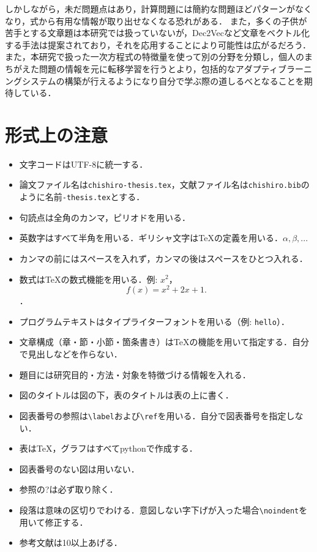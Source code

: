 \documentclass[a4j,11pt,report]{jsbook}
\begin{document}
しかしながら，未だ問題点はあり，計算問題には簡約な問題ほどパターンがなくなり，式から有用な情報が取り出せなくなる恐れがある．
また，多くの子供が苦手とする文章題は本研究では扱っていないが，Dec2Vecなど文章をベクトル化する手法は提案されており，それを応用することにより可能性は広がるだろう．
また，本研究で扱った一次方程式の特徴量を使って別の分野を分類し，個人のまちがえた問題の情報を元に転移学習を行うとより，包括的なアダプティブラーニングシステムの構築が行えるようになり自分で学ぶ際の道しるべとなることを期待している．



\chapter{形式上の注意}

\begin{itemize}
  \item 文字コードはUTF-8に統一する．
  \item 論文ファイル名は\texttt{chishiro-thesis.tex}，文献ファイル名は\texttt{chishiro.bib}のように名前\texttt{-thesis.tex}とする．
  \item 句読点は全角のカンマ，ピリオドを用いる．
  \item 英数字はすべて半角を用いる．ギリシャ文字は{\TeX}の定義を用いる．$\alpha, \beta, ...$
  \item カンマの前にはスペースを入れず，カンマの後はスペースをひとつ入れる．
  \item 数式は{\TeX}の数式機能を用いる．例: $x^2$，\[f(x) = x^2 + 2x + 1.\]．
  \item プログラムテキストはタイプライターフォントを用いる（例: \texttt{hello}）．
  \item 文章構成（章・節・小節・箇条書き）は{\TeX}の機能を用いて指定する．自分で見出しなどを作らない．
  \item 題目には研究目的・方法・対象を特徴づける情報を入れる．
  \item 図のタイトルは図の下，表のタイトルは表の上に書く．
  \item 図表番号の参照は\verb#\label#および\verb#\ref#を用いる．自分で図表番号を指定しない．
  \item 表は{\TeX}，グラフはすべてpythonで作成する．
  \item 図表番号のない図は用いない．
  \item 参照の?は必ず取り除く．
  \item 段落は意味の区切りでわける．意図しない字下げが入った場合\verb#\noindent#を用いて修正する．
  \item 参考文献は10以上あげる．
\end{itemize}
\fi
\end{document}
